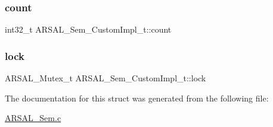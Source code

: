 \subsubsection{\texorpdfstring{count}{count}}
{\footnotesize\ttfamily int32\+\_\+t A\+R\+S\+A\+L\+\_\+\+Sem\+\_\+\+Custom\+Impl\+\_\+t\+::count}

\hypertarget{structARSAL__Sem__CustomImpl__t_a5b0c944edc475b603049210aa09f4383}{}\label{structARSAL__Sem__CustomImpl__t_a5b0c944edc475b603049210aa09f4383} 
\subsubsection{\texorpdfstring{lock}{lock}}
{\footnotesize\ttfamily A\+R\+S\+A\+L\+\_\+\+Mutex\+\_\+t A\+R\+S\+A\+L\+\_\+\+Sem\+\_\+\+Custom\+Impl\+\_\+t\+::lock}



The documentation for this struct was generated from the following file\+:\begin{DoxyCompactItemize}
\item 
\hyperlink{ARSAL__Sem_8c}{A\+R\+S\+A\+L\+\_\+\+Sem.\+c}\end{DoxyCompactItemize}
